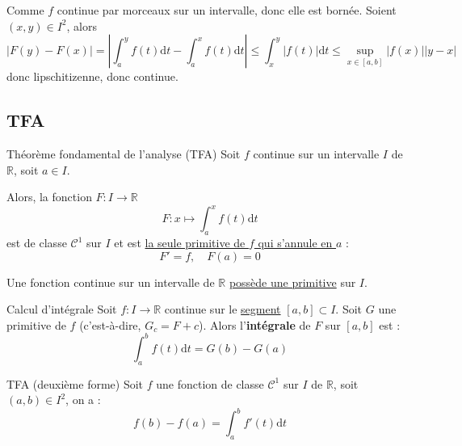 \begin{myproof}{}{}
  Comme $f$ continue par morceaux sur un intervalle, donc elle est bornée.
Soient $(x, y) \in I ^{2}$, alors 
\begin{equation}
  |F(y) - F(x) | = \left| \int_{a}^{y} f(t) \mathrm{d} t - \int_{a}^{x} f(t) \mathrm{d} t \right| \le \int_{x}^{y} |f(t) | \mathrm{d} t \le \sup _{x \in [a,b]} |f(x)| |y-x|
\end{equation}
donc lipschitizenne, donc continue.
\end{myproof}

\subsection{TFA} %
\label{sub:TFA}

\begin{Theorem}{\color{red} Théorème fondamental de l'analyse (TFA)}{}
Soit $f$ continue sur un intervalle $I$ de $\mathbb{R}$, soit $a \in I$. 

Alors, la fonction $F : I \to \mathbb{R}$
\begin{equation}
  F : x \mapsto \int_{a}^{x} f(t) \mathrm{d}t
\end{equation}
est de classe $\mathscr{C} ^{1}$ sur $I$ et est \underline{la seule primitive de $f$ qui s'annule en $a$} : 
\begin{equation}
  F' = f,\quad F(a) = 0
\end{equation}
\end{Theorem}

\begin{Corollary}{}{}
Une fonction continue sur un intervalle de $\mathbb{R}$ \underline{possède une primitive} sur $I$.
\end{Corollary}

\begin{Corollary}{Calcul d'intégrale}{}
  Soit $f : I \to \mathbb{R}$ continue sur le \underline{segment} $[a,b] \subset I$. Soit $G$ une primitive de $f$ (c'est-à-dire, $G_c = F + c$). Alors  l'\textbf{intégrale} de $F$ sur $[a,b]$ est :
  \begin{equation}
    \int_{a}^{b} f(t) \mathrm{d} t = G(b) - G(a)
  \end{equation}
\end{Corollary}

\begin{Theorem}{\color{red} TFA (deuxième forme)}{}
Soit $f$ une fonction de classe $\mathcal{C} ^{1}$ sur $I$ de $\mathbb{R}$, soit $(a,b) \in I ^{2}$, on a :
\begin{equation}
  f(b) - f(a) = \int_{a}^{b} f'(t) \mathrm{d} t
\end{equation}
\end{Theorem}

